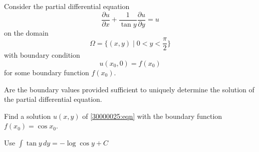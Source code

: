 Consider the partial differential equation
\begin{equation}
\frac{\partial u}{\partial x}
+
\frac{1}{\tan y}
\frac{\partial u}{\partial y}
=
u
\label{30000025:eqn}
\end{equation}
on the domain
\[
\Omega
=
\biggl\{
(x,y)
\;\bigg|\;
0<y<\frac{\pi}2
\biggr\}
\]
with boundary condition
\[
u(x_0,0) = f(x_0)
\]
for some boundary function $f(x_0)$.
\begin{teilaufgaben}
\item
Are the boundary values provided sufficient to uniquely determine the
solution of the partial differential equation.
\item
Find a solution $u(x,y)$ of \eqref{30000025:eqn} with the boundary function
$f(x_0)=\cos x_0$.
\end{teilaufgaben}

\begin{hinweis}
Use $\int\tan y\,dy = -\log\cos y+C$
\end{hinweis}


